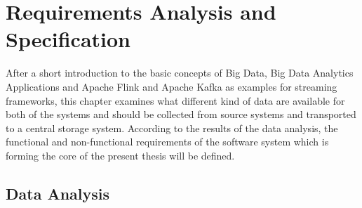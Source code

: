 \chapter{Requirements Analysis and Specification}

After a short introduction to the basic concepts of Big Data, Big Data Analytics Applications
and Apache Flink and Apache Kafka as examples for streaming frameworks, this chapter
examines what different kind of data are available for both of the systems and should be collected from source systems and
transported to a central storage system. According to the results of the data analysis, the
functional and non-functional requirements of the software system which is forming the core of
the present thesis will be defined.

\section{Data Analysis}
%
%
%
%
%

